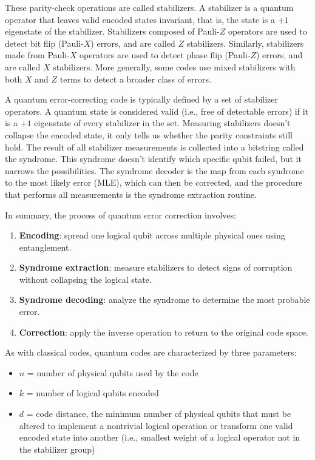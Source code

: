 These parity-check operations are called stabilizers. A stabilizer is a quantum operator that leaves valid encoded states invariant, that is, the state is a $+1$ eigenstate of the stabilizer. Stabilizers composed of Pauli-$Z$ operators are used to detect bit flip (Pauli-$X$) errors, and are called $Z$ stabilizers. Similarly, stabilizers made from Pauli-$X$ operators are used to detect phase flip (Pauli-$Z$) errors, and are called $X$ stabilizers. More generally, some codes use mixed stabilizers with both $X$ and $Z$ terms to detect a broader class of errors.

A quantum error-correcting code is typically defined by a set of stabilizer operators. A quantum state is considered valid (i.e., free of detectable errors) if it is a $+1$ eigenstate of every stabilizer in the set. Measuring stabilizers doesn’t collapse the encoded state, it only tells us whether the parity constraints still hold. The result of all stabilizer measurements is collected into a bitstring called the syndrome. This syndrome doesn’t identify which specific qubit failed, but it narrows the possibilities. The syndrome decoder is the map from each syndrome to the most likely error (MLE), which can then be corrected, and the procedure that performs all measurements is the syndrome extraction routine.

In summary, the process of quantum error correction involves:

\begin{enumerate}
\item \textbf{Encoding}: spread one logical qubit across multiple physical ones using entanglement.
\item \textbf{Syndrome extraction}: measure stabilizers to detect signs of corruption without collapsing the logical state.
\item \textbf{Syndrome decoding}: analyze the syndrome to determine the most probable error.
\item \textbf{Correction}: apply the inverse operation to return to the original code space.
\end{enumerate}

As with classical codes, quantum codes are characterized by three parameters:

\begin{itemize}
\item $n$ = number of physical qubits used by the code
\item $k$ = number of logical qubits encoded
\item $d$ = code distance, the minimum number of physical qubits that must be altered to implement a nontrivial logical operation or transform one valid encoded state into another (i.e., smallest weight of a logical operator not in the stabilizer group)
\end{itemize}

